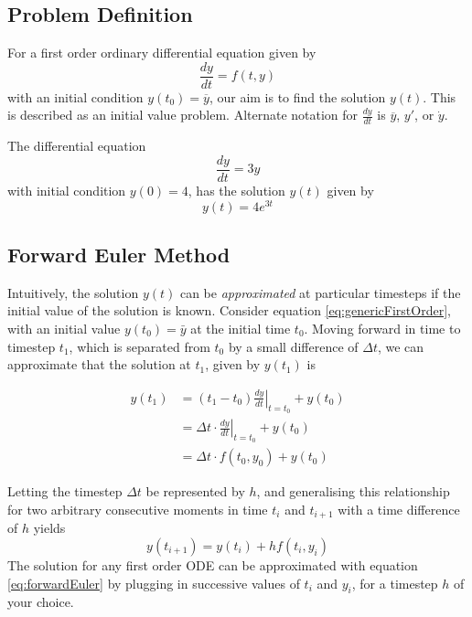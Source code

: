 \subsection{Problem Definition}
For a first order ordinary differential equation given by 
\begin{equation}\label{eq:genericFirstOrder}
    \frac{dy}{dt} = f(t,y)
\end{equation}
with an initial condition $y(t_0)=\overline{y}$, our aim is to find the solution $y(t)$. This is described as an initial value problem. Alternate notation for $\frac{dy}{dt}$ is $\overline{y}$, $y'$, or $\dot{y}$.

\begin{example}
 The differential equation
 \begin{equation*}
     \frac{dy}{dt}=3y
 \end{equation*}
 with initial condition $y(0) = 4$, has the solution $y(t)$ given by
 \begin{equation*}
     y(t) = 4e^{3t}
 \end{equation*}
\end{example}

\subsection{Forward Euler Method}
Intuitively, the solution $y(t)$ can be \emph{approximated} at particular timesteps if the initial value of the solution is known. Consider equation \ref{eq:genericFirstOrder}, with an initial value $y(t_0) = \bar{y}$ at the initial time $t_0$. Moving forward in time to timestep $t_1$, which is separated from $t_0$ by a small difference of $\Delta t$, we can approximate that the solution at $t_1$, given by $y(t_1)$ is

\begin{align*}
    y(t_1) &= \left.(t_1 - t_0) \frac{dy}{dt}\right|_{t=t_0} + y(t_0)\\
    &=\left.\Delta t\cdot \frac{dy}{dt}\right|_{t=t_0} + y(t_0)\\
    &=\Delta t \cdot f(t_0, y_0) + y(t_0)
\end{align*}

Letting the timestep $\Delta t$ be represented by $h$, and generalising this relationship for two arbitrary consecutive moments in time $t_i$ and $t_{i+1}$ with a time difference of $h$ yields
\begin{equation}\label{eq:forwardEuler}
    y(t_{i+1}) = y(t_i) + hf(t_i, y_i)
\end{equation}
The solution for any first order ODE can be approximated with equation \ref{eq:forwardEuler} by plugging in successive values of $t_i$ and $y_i$, for a timestep $h$ of your choice.

